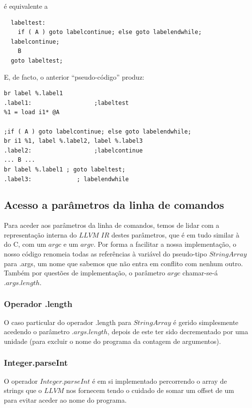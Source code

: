 \documentclass[11pt,a4paper]{article}
\begin{document}
é equivalente a

\begin{lstlisting}
  labeltest:
    if ( A ) goto labelcontinue; else goto labelendwhile;
  labelcontinue;
    B
  goto labeltest;
\end{lstlisting}

E, de facto, o anterior ``pseudo-código'' produz:

\begin{lstlisting}
br label %.label1
.label1:                  ;labeltest
%1 = load i1* @A

;if ( A ) goto labelcontinue; else goto labelendwhile;
br i1 %1, label %.label2, label %.label3
.label2:                  ;labelcontinue
... B ... 
br label %.label1 ; goto labeltest;
.label3:             ; labelendwhile
\end{lstlisting}

\subsection{Acesso a parâmetros da linha de comandos}
Para aceder aos parâmetros da linha de comandos, temos de lidar com a representação interna do $LLVM$ $IR$ destes parâmetros, que é em tudo similar à do C, com um $argc$ e um $argv$. Por forma a facilitar a nossa implementação, o nosso código renomeia todas as referências à variável do pseudo-tipo $StringArray$ para .args, um nome que sabemos que não entra em conflito com nenhum outro. Também por questões de implementação, o parâmetro $argc$ chamar-se-á $.args.length$.



\subsubsection{Operador .length}
O caso particular do operador .length para $StringArray$ é gerido simplesmente acedendo o parâmetro $.args.length$, depois de este ter sido decrementado por uma unidade (para excluir o nome do programa da contagem de argumentos).

\subsubsection{Integer.parseInt}

O operador $Integer.parseInt$ é em si implementado percorrendo o array de strings que o $LLVM$ nos fornecem tendo o cuidado de somar um offset de um para evitar aceder ao nome do programa.
\end{document}
